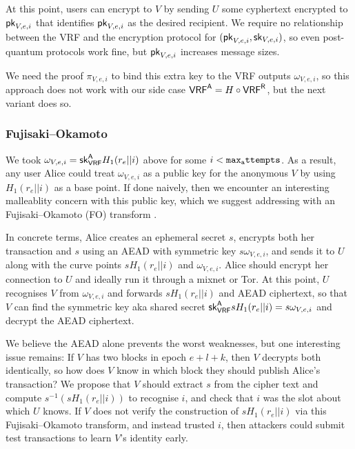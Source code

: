 At this point, users can encrypt to $V$ by sending $U$ some cyphertext encrypted to $\mathsf{pk}_{V,e,i}$ that identifies $\mathsf{pk}_{V,e,i}$ as the desired recipient.  We require no relationship between the VRF and the encryption protocol for $(\mathsf{pk}_{V,e,i},\mathsf{sk}_{V,e,i})$, so even post-quantum protocols work fine, but $\mathsf{pk}_{V,e,i}$ increases message sizes.

We need the proof $\pi_{V,e,i}$ to bind this extra key to the VRF outputs $\omega_{V,e,i}$, so this approach does not work with our side case $\mathsf{VRF}^{\mathsf{A}} = H \circ \mathsf{VRF}^{\mathsf{R}}$, but the next variant does so.

\subsubsection{Fujisaki–Okamoto}

We took $\omega_{V,e,i} = \mathsf{sk}_{\mathsf{VRF}}^{\mathsf{A}} H_1(r_e || i)$ above for some $i < \mathtt{max_attempts}$.  As a result, any user Alice could treat $\omega_{V,e,i}$ as a public key for the anonymous $V$ by using $H_1(r_e || i)$ as a base point.  If done naively, then we encounter an interesting malleablity concern with this public key, which we suggest addressing with an Fujisaki–Okamoto (FO) transform \cite{FO_transform}.  

In concrete terms, Alice creates an ephemeral secret $s$, encrypts both her transaction and $s$ using an AEAD with symmetric key $s \omega_{V,e,i}$, and sends it to $U$ along with the curve points $s H_1(r_e || i)$ and $\omega_{V,e,i}$.  Alice should encrypt her connection to $U$ and ideally run it through a mixnet or Tor.  At this point, $U$ recognises $V$ from $\omega_{V,e,i}$ and forwards $s H_1(r_e || i)$ and AEAD ciphertext, so that $V$ can find the symmetric key aka shared secret $\mathsf{sk}_{\mathsf{VRF}}^{\mathsf{A}} s H_1(r_e || i) = s \omega_{V,e,i}$ and decrypt the AEAD ciphertext.

We believe the AEAD alone prevents the worst weaknesses, but one interesting issue remains:  If $V$ has two blocks in epoch $e+l+k$, then $V$ decrypts both identically, so how does $V$ know in which block they should publish Alice's transaction?  We propose that $V$ should extract $s$ from the cipher text and compute $s^{-1} (s H_1(r_e || i))$ to recognise $i$, and check that $i$ was the slot about which $U$ knows.  If $V$ does not verify the construction of $s H_1(r_e || i)$ via this Fujisaki–Okamoto transform, and instead trusted $i$, then attackers could submit test transactions to learn $V$'s identity early. 

